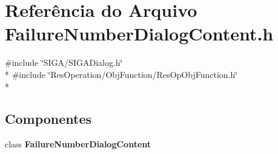 \section{Referência do Arquivo Failure\+Number\+Dialog\+Content.\+h}
\label{_obj_function_2_failure_number_2_failure_number_dialog_content_8h}
{\ttfamily \#include \char`\"{}S\+I\+G\+A/\+S\+I\+G\+A\+Dialog.\+h\char`\"{}}\\*
{\ttfamily \#include \char`\"{}Res\+Operation/\+Obj\+Function/\+Res\+Op\+Obj\+Function.\+h\char`\"{}}\\*
\subsection*{Componentes}
\begin{DoxyCompactItemize}
\item 
class {\bf Failure\+Number\+Dialog\+Content}
\end{DoxyCompactItemize}
